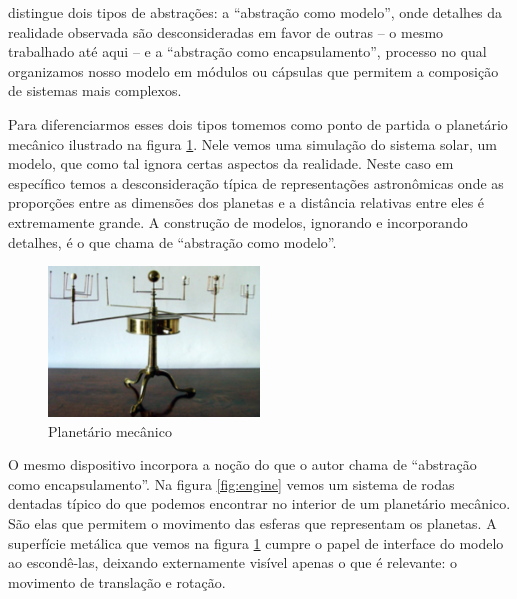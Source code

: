  distingue dois tipos de abstrações: a ``abstração como modelo'', onde detalhes da realidade observada são desconsideradas em favor de outras -- o mesmo trabalhado até aqui -- e a ``abstração como encapsulamento'', processo no qual organizamos nosso modelo em módulos ou cápsulas que permitem a composição de sistemas mais complexos. 



Para diferenciarmos esses dois tipos tomemos como ponto de partida o planetário mecânico ilustrado na figura \ref{fig:planetario}. Nele vemos uma simulação do sistema solar, um modelo, que como tal ignora certas aspectos da realidade. Neste caso em específico temos a desconsideração típica de representações astronômicas onde as proporções entre as dimensões dos planetas e a distância relativas entre eles é extremamente grande. A construção de modelos, ignorando e incorporando detalhes, é o que  chama de ``abstração como modelo''. 

\begin{figure}[!htb]
	\caption{Planetário mecânico}\label{fig:planetario}
	\begin{center}
		\includegraphics[width=0.50\textwidth]{imagens/planetario}
	\end{center}
\end{figure}

O mesmo dispositivo incorpora a noção do que o autor chama de ``abstração como encapsulamento''. Na figura \ref{fig:engine} vemos um sistema de rodas dentadas típico do que podemos encontrar no interior de um planetário mecânico. São elas que permitem o movimento das esferas que representam os planetas. A superfície metálica que vemos na figura \ref{fig:planetario} cumpre o papel de interface do modelo ao escondê-las, deixando externamente visível apenas o que é relevante: o movimento de translação e rotação. 


